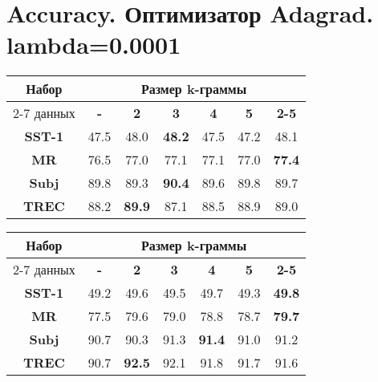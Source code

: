 
\chapter{Accuracy. Оптимизатор Adagrad. lambda=0.0001}

\begin{minipage}{\linewidth}
\begin{center}
 \label{tab:title} 
\begin{tabular}{|c|c|c|c|c|c|c|}
\hline
\multirow{2}{*}{Набор}   &         \multicolumn{6}{c|}{Размер k-граммы} \\ \cline{2-7} 
     данных              & \textbf{-} & \textbf{2} & \textbf{3} & \textbf{4} & \textbf{5} & \textbf{2-5} \\ \hline
\textbf{SST-1}           &  47.5    & 48.0     &\textbf{48.2}&47.5&  47.2    & 48.1           \\  \hline
\textbf{MR}              &  76.5    & 77.0     & 77.1     & 77.1   & 77.0     & \textbf{77.4} \\ \hline
\textbf{Subj}            &  89.8    & 89.3     & \textbf{90.4}     & 89.6     & 89.8 & 89.7 \\ \hline
\textbf{TREC}            &  88.2    & \textbf{89.9} & 87.1& 88.5   &  88.9    & 89.0  \\ \hline
\end{tabular}
\vspace{5mm}
\end{center}
\end{minipage}
\vspace{5mm}

\begin{minipage}{\linewidth}
\begin{center}
 \label{tab:title} 
\begin{tabular}{|c|c|c|c|c|c|c|}
\hline
\multirow{2}{*}{Набор}   &                \multicolumn{6}{c|}{Размер k-граммы} \\ \cline{2-7} 
     данных              & \textbf{-} & \textbf{2} & \textbf{3} & \textbf{4} & \textbf{5} & \textbf{2-5} \\ \hline
\textbf{SST-1}           & 49.2     &  49.6    & 49.5    & 49.7     & 49.3     & \textbf{49.8}  \\ \hline
\textbf{MR}              & 77.5     &  79.6    & 79.0    & 78.8     & 78.7     & \textbf{79.7} \\\hline
\textbf{Subj}            & 90.7     &  90.3    & 91.3    &\textbf{91.4}& 91.0  &  91.2 \\\hline
\textbf{TREC}            & 90.7     &  \textbf{92.5}     & 92.1     & 91.8     & 91.7     &  91.6 \\\hline
\end{tabular}
\end{center}
\end{minipage}
\vspace{5mm}

